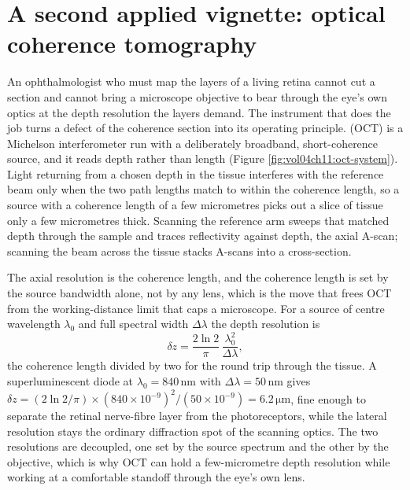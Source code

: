 \section{A second applied vignette: optical coherence tomography}

An ophthalmologist who must map the layers of a living retina cannot cut a section
and cannot bring a microscope objective to bear through the eye's own optics at the
depth resolution the layers demand. The instrument that does the job turns a defect
of the coherence section into its operating principle.  (OCT) is a Michelson interferometer run with a deliberately broadband,
short-coherence source, and it reads depth rather than length (Figure
\ref{fig:vol04ch11:oct-system}). Light returning from a chosen depth in the tissue
interferes with the reference beam only when the two path lengths match to within
the coherence length, so a source with a coherence length of a few micrometres
picks out a slice of tissue only a few micrometres thick. Scanning the reference
arm sweeps that matched depth through the sample and traces reflectivity against
depth, the axial A-scan; scanning the beam across the tissue stacks A-scans into a
cross-section.



The axial resolution is the coherence length, and the coherence length is set by
the source bandwidth alone, not by any lens, which is the move that frees OCT from
the working-distance limit that caps a microscope. For a source of centre
wavelength $\lambda_0$ and full spectral width $\Delta\lambda$ the depth resolution
is
\[
\delta z = \frac{2\ln 2}{\pi}\,\frac{\lambda_0^{2}}{\Delta\lambda},
\]
the coherence length divided by two for the round trip through the tissue. A
superluminescent diode at $\lambda_0 = 840\,\si{\nano\meter}$ with
$\Delta\lambda = 50\,\si{\nano\meter}$ gives $\delta z = (2\ln 2/\pi)\times
(840\times 10^{-9})^2/(50\times 10^{-9}) = 6.2\,\si{\micro\meter}$, fine enough to
separate the retinal nerve-fibre layer from the photoreceptors, while the lateral
resolution stays the ordinary diffraction spot of the scanning optics. The two
resolutions are decoupled, one set by the source spectrum and the other by the
objective, which is why OCT can hold a few-micrometre depth resolution while
working at a comfortable standoff through the eye's own lens.

